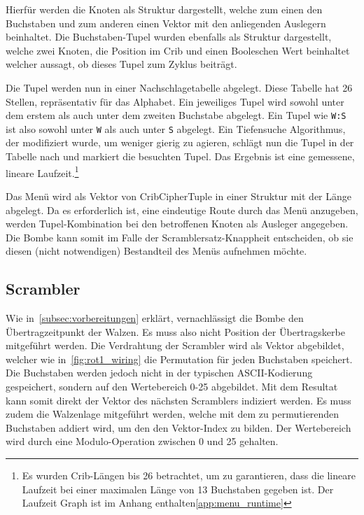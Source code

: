 Hierfür werden die Knoten als Struktur dargestellt, welche zum einen den Buchstaben und zum anderen einen Vektor mit den anliegenden Auslegern beinhaltet. 
Die Buchstaben-Tupel wurden ebenfalls als Struktur dargestellt, welche zwei Knoten, die Position im Crib und einen Booleschen Wert beinhaltet welcher aussagt, ob dieses Tupel zum Zyklus beiträgt.



\noindent

Die Tupel werden nun in einer \glqq Nachschlagetabelle\grqq{} abgelegt.
Diese Tabelle hat 26 Stellen, repräsentativ für das Alphabet.
Ein jeweiliges Tupel wird sowohl unter dem erstem als auch unter dem zweiten Buchstabe abgelegt. 
Ein Tupel wie \texttt{W:S} ist also sowohl unter \texttt{W} als auch unter \texttt{S} abgelegt.
Ein Tiefensuche Algorithmus, der modifiziert wurde, um weniger \glqq gierig\grqq{} zu agieren, schlägt nun die Tupel in der Tabelle nach und markiert die besuchten Tupel.
Das Ergebnis ist eine gemessene, lineare Laufzeit.\footnote{Es wurden Crib-Längen bis 26 betrachtet, um zu garantieren, dass die lineare Laufzeit bei einer maximalen Länge von 13 Buchstaben gegeben ist. Der Laufzeit Graph ist im Anhang enthalten\cref{app:menu_runtime}} 

Das Menü wird als Vektor von \glqq CribCipherTuple\grqq{} in einer Struktur mit der Länge abgelegt.
Da es erforderlich ist, eine eindeutige \glqq Route\grqq{} durch das Menü anzugeben, werden Tupel-Kombination bei den betroffenen Knoten als Ausleger angegeben. 
Die Bombe kann somit im Falle der \glqq Scramblersatz-Knappheit\grqq{} entscheiden, ob sie diesen (nicht notwendigen) Bestandteil des Menüs aufnehmen möchte.

\subsection{Scrambler}\label{subsec:impl_scrambler}
Wie in~\cref{subsec:vorbereitungen} erklärt, vernachlässigt die Bombe den Übertragzeitpunkt der Walzen.
Es muss also nicht Position der Übertragskerbe mitgeführt werden.
Die Verdrahtung der Scrambler wird als Vektor abgebildet, welcher wie in~\cref{fig:rot1_wiring} die Permutation für jeden Buchstaben speichert.
Die Buchstaben werden jedoch nicht in der typischen ASCII-Kodierung gespeichert, sondern auf den Wertebereich 0-25 abgebildet.
Mit dem Resultat kann somit direkt der Vektor des nächsten Scramblers indiziert werden.
Es muss zudem die Walzenlage mitgeführt werden, welche mit dem zu permutierenden Buchstaben addiert wird, um den den Vektor-Index zu bilden.
Der Wertebereich wird durch eine Modulo-Operation zwischen 0 und 25 gehalten.

